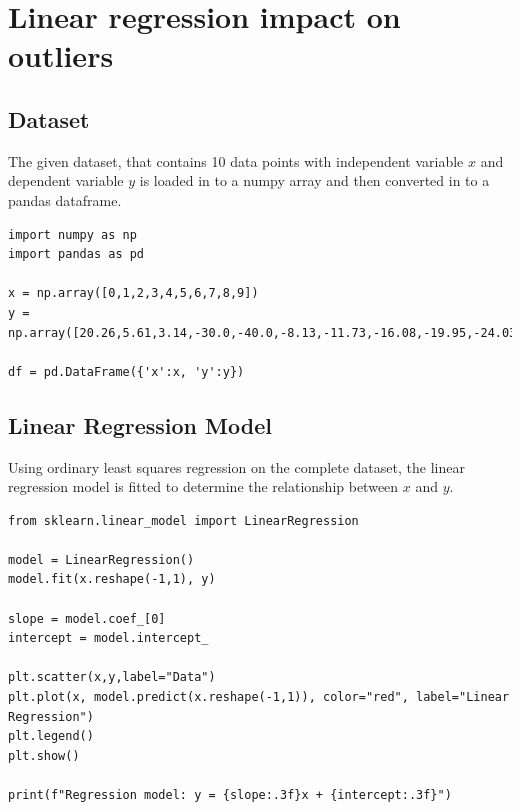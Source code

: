 \documentclass[12pt]{article}
\begin{document}
\section{Linear regression impact on outliers}

\subsection{Dataset }
The given dataset, that contains 10 data points with independent variable $x$ and dependent variable $y$ is loaded in to a numpy array and then converted in to a pandas dataframe. 

\begin{lstlisting}[caption={\footnotesize Loading data in to pandas dataframe}]
import numpy as np
import pandas as pd

x = np.array([0,1,2,3,4,5,6,7,8,9])
y = np.array([20.26,5.61,3.14,-30.0,-40.0,-8.13,-11.73,-16.08,-19.95,-24.03])

df = pd.DataFrame({'x':x, 'y':y})
\end{lstlisting}

\subsection{Linear Regression Model}

Using ordinary least squares regression on the complete dataset, the linear regression model is fitted to determine the relationship between $x$ and $y$.

\begin{lstlisting}[caption={\footnotesize Linear Regression Implementation and Ploting}]
from sklearn.linear_model import LinearRegression

model = LinearRegression()
model.fit(x.reshape(-1,1), y)

slope = model.coef_[0]
intercept = model.intercept_

plt.scatter(x,y,label="Data")
plt.plot(x, model.predict(x.reshape(-1,1)), color="red", label="Linear Regression")
plt.legend()
plt.show()

print(f"Regression model: y = {slope:.3f}x + {intercept:.3f}")
\end{lstlisting}
\end{document}

